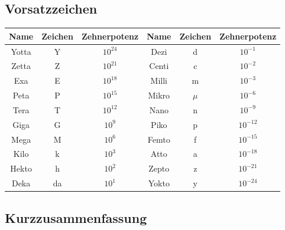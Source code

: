 \documentclass[12pt,a4paper]{article}%
\numberwithin{equation}{section}
\numberwithin{equation}{subsection}
\begin{document}
\subsection{Vorsatzzeichen}
\begin{tabular} {|c|c|c|c|c|c|} \hline
Name & Zeichen & Zehnerpotenz & Name & Zeichen & Zehnerpotenz \\ \hline
Yotta & Y & $10^{24}$ & Dezi & d & $10^{-1}$ \\ \hline
Zetta & Z & $10^{21}$ & Centi & c & $10^{-2}$ \\ \hline
Exa & E & $10^{18}$ & Milli & m & $10^{-3}$ \\ \hline
Peta & P & $10^{15}$ & Mikro & $\mu$ & $10^{-6}$ \\ \hline
Tera & T & $10^{12}$ & Nano & n & $10^{-9}$ \\ \hline
Giga & G & $10^{9}$ & Piko & p & $10^{-12}$ \\ \hline
Mega & M & $10^{6}$ & Femto & f & $10^{-15}$ \\ \hline
Kilo & k & $10^{3}$ & Atto & a & $10^{-18}$ \\ \hline
Hekto & h & $10^{2}$ & Zepto & z & $10^{-21}$ \\ \hline
Deka & da & $10^{1}$ & Yokto & y & $10^{-24}$ \\ \hline
\end{tabular}
  
  \newpage
\subsection{Kurzzusammenfassung}
\end{document}
